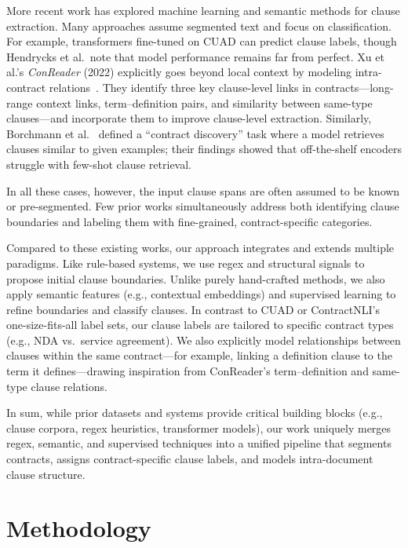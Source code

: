 \documentclass[11pt, oneside]{article}   	%
\begin{document}
More recent work has explored machine learning and semantic methods for clause extraction. Many approaches assume segmented text and focus on classification. For example, transformers fine-tuned on CUAD can predict clause labels, though Hendrycks et al.\ note that model performance remains far from perfect. Xu et al.’s \textit{ConReader} (2022) explicitly goes beyond local context by modeling intra-contract relations~\cite{xu2022conreader}. They identify three key clause-level links in contracts---long-range context links, term--definition pairs, and similarity between same-type clauses---and incorporate them to improve clause-level extraction. Similarly, Borchmann et al.~\cite{borchmann2020contract} defined a “contract discovery” task where a model retrieves clauses similar to given examples; their findings showed that off-the-shelf encoders struggle with few-shot clause retrieval.

In all these cases, however, the input clause spans are often assumed to be known or pre-segmented. Few prior works simultaneously address both identifying clause boundaries and labeling them with fine-grained, contract-specific categories.

Compared to these existing works, our approach integrates and extends multiple paradigms. Like rule-based systems, we use regex and structural signals to propose initial clause boundaries. Unlike purely hand-crafted methods, we also apply semantic features (e.g., contextual embeddings) and supervised learning to refine boundaries and classify clauses. In contrast to CUAD or ContractNLI’s one-size-fits-all label sets, our clause labels are tailored to specific contract types (e.g., NDA vs.\ service agreement). We also explicitly model relationships between clauses within the same contract---for example, linking a definition clause to the term it defines---drawing inspiration from ConReader’s term--definition and same-type clause relations. 

In sum, while prior datasets and systems provide critical building blocks (e.g., clause corpora, regex heuristics, transformer models), our work uniquely merges regex, semantic, and supervised techniques into a unified pipeline that segments contracts, assigns contract-specific clause labels, and models intra-document clause structure.




\section*{Methodology}
\end{document}

